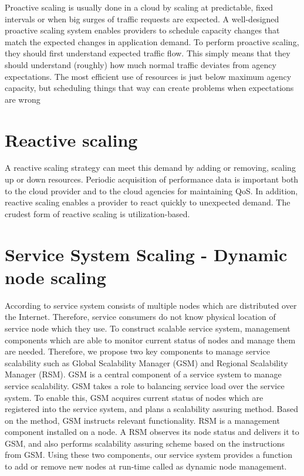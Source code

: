 Proactive scaling is usually done in a cloud by scaling at predictable, fixed intervals or when big surges of traffic requests are expected. A well-designed proactive scaling system enables providers to schedule capacity changes that match the expected changes in application demand. To perform proactive scaling, they should first understand expected traffic flow. This simply means that they should understand (roughly) how much normal traffic deviates from agency expectations. The most efficient use of resources is just below maximum agency capacity, but scheduling things that way can create problems when expectations are wrong \cite{falatah_cloud_2014}\cite{reese_cloud_nodate}



\section{Reactive scaling}

A reactive scaling strategy can meet this demand by adding or removing, scaling up or down resources. Periodic acquisition of performance data is important both to the cloud provider and to the cloud agencies for maintaining QoS. In addition, reactive scaling enables a provider to react quickly to unexpected demand. The crudest form of reactive scaling is utilization-based.\cite{falatah_cloud_2014}\cite{reese_cloud_nodate}

\section{Service System Scaling - Dynamic node scaling}
According to \cite{lee_software_2010} service system consists of multiple nodes which are distributed over the Internet. Therefore, service consumers do not know physical location of service node which they use. To construct scalable service system, management components which are able to monitor current status of nodes and manage them are needed. Therefore, we propose two key components to manage service scalability such as Global Scalability Manager (GSM) and Regional Scalability Manager (RSM). 
GSM is a central component of a service system to manage service scalability. GSM takes a role to balancing service load over the service system. To enable this, GSM acquires current status of nodes which are registered into the service system, and plans a scalability assuring method. Based on the method, GSM instructs relevant functionality. RSM is a management component installed on a node. A RSM observes its node status and delivers it to GSM, and also performs scalability assuring scheme based on the instructions from GSM. Using these two components, our service system provides a function to add or remove new nodes at run-time called as dynamic node management.

